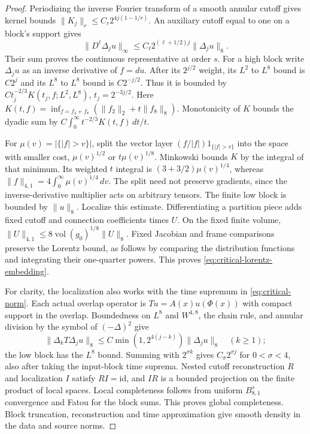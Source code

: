 \documentclass[11pt]{article}
\numberwithin{equation}{section}
\theoremstyle{definition}
\theoremstyle{remark}
\begin{document}
\begin{proof}
Periodizing the inverse Fourier transform of a smooth
annular cutoff gives kernel bounds
$\|K_j\|_r\le C_r2^{4j(1-1/r)}$.
An auxiliary cutoff equal to one on a block's support gives
\[
 \|D^\ell\Delta_ju\|_\infty
       \le C_\ell2^{(\ell+1/2)j}\|\Delta_ju\|_8.
\]
Their sum proves the continuous representative at order $s$.
For a high block write $\Delta_ju$ as an inverse derivative
of $f=du$. After its $2^{j/2}$ weight, its $L^2$ to $L^8$
bound is $C2^j$ and its $L^8$ to $L^8$ bound is
$C2^{-j/2}$. Thus it is bounded by
$Ct_j^{-2/3}K(t_j,f;L^2,L^8)$, $t_j=2^{-3j/2}$.
Here $K(t,f)=\inf_{f=f_2+f_8}(\|f_2\|_2+t\|f_8\|_8)$.
Monotonicity of $K$ bounds the dyadic sum by
$C\int_0^\infty t^{-2/3}K(t,f)\,dt/t$.

For $\mu(v)=|\{|f|>v\}|$, split the vector layer
$(f/|f|)1_{\{|f|>v\}}$ into the space with smaller cost,
$\mu(v)^{1/2}$ or $t\mu(v)^{1/8}$.
Minkowski bounds $K$ by the integral of that minimum.
Its weighted $t$ integral is
$(3+3/2)\mu(v)^{1/4}$, whereas
$\|f\|_{4,1}=4\int_0^\infty\mu(v)^{1/4}\,dv$.
The split need not preserve gradients, since the
inverse-derivative multiplier acts on arbitrary tensors.
The finite low block is bounded by $\|u\|_8$.
Localize this estimate. Differentiating a partition
piece adds fixed cutoff and connection coefficients
times $U$. On the fixed finite volume,
$\|U\|_{4,1}\le8\operatorname{vol}(g_0)^{1/8}\|U\|_8$.
Fixed Jacobian and frame comparisons preserve the Lorentz
bound, as follows by comparing the distribution functions
and integrating their one-quarter powers. This proves
\eqref{eq:critical-lorentz-embedding}.

For clarity, the localization also works with the time
supremum in \eqref{eq:critical-norm}. Each actual overlap
operator is $Tu=A(x)u(\Phi(x))$ with compact support in the
overlap. Boundedness on $L^8$ and $W^{4,8}$, the chain
rule, and annular division by the symbol of
$(-\Delta)^2$ give
\[
 \|\Delta_kT\Delta_ju\|_8
 \le C\min(1,2^{4(j-k)})\|\Delta_ju\|_8\quad(k\ge1);
\]
the low block has the $L^8$ bound.
Summing with $2^{\sigma k}$ gives $C_\sigma2^{\sigma j}$
for $0<\sigma<4$, also after taking the input-block
time suprema. Nested cutoff reconstruction $R$ and
localization $I$ satisfy $RI=\mathrm{id}$, and $IR$
is a bounded projection on the finite product of local
spaces. Local completeness follows from uniform
$B^s_{8,1}$ convergence and Fatou for the block sums.
This proves global completeness. Block truncation,
reconstruction and time approximation give smooth
density in the data and source norms.


\end{proof}
\end{document}
